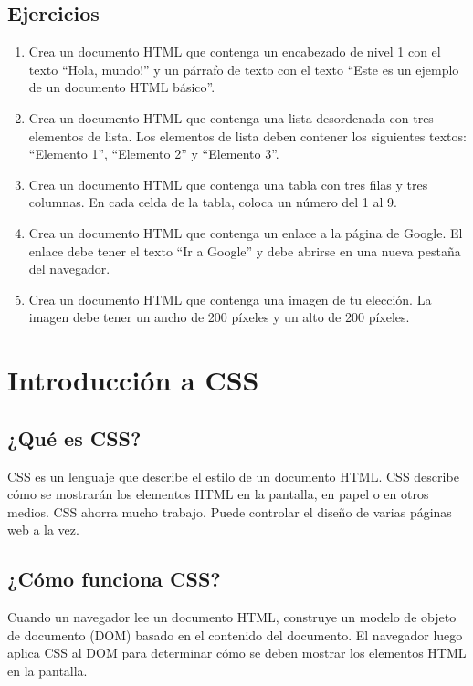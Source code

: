\documentclass[
  a4paper,
  DIV=11,
  numbers=noendperiod,
  onepage,
  openany]{scrreprt}
\begin{document}
\begin{tcolorbox}
\section{Ejercicios}\label{ejercicios}

\begin{enumerate}
\def\labelenumi{\arabic{enumi}.}
\item
  Crea un documento HTML que contenga un encabezado de nivel 1 con el
  texto ``Hola, mundo!'' y un párrafo de texto con el texto ``Este es un
  ejemplo de un documento HTML básico''.
\item
  Crea un documento HTML que contenga una lista desordenada con tres
  elementos de lista. Los elementos de lista deben contener los
  siguientes textos: ``Elemento 1'', ``Elemento 2'' y ``Elemento 3''.
\item
  Crea un documento HTML que contenga una tabla con tres filas y tres
  columnas. En cada celda de la tabla, coloca un número del 1 al 9.
\item
  Crea un documento HTML que contenga un enlace a la página de Google.
  El enlace debe tener el texto ``Ir a Google'' y debe abrirse en una
  nueva pestaña del navegador.
\item
  Crea un documento HTML que contenga una imagen de tu elección. La
  imagen debe tener un ancho de 200 píxeles y un alto de 200 píxeles.
\end{enumerate}

\chapter{Introducción a CSS}\label{introducciuxf3n-a-css}

\section{¿Qué es CSS?}\label{quuxe9-es-css}

CSS es un lenguaje que describe el estilo de un documento HTML. CSS
describe cómo se mostrarán los elementos HTML en la pantalla, en papel o
en otros medios. CSS ahorra mucho trabajo. Puede controlar el diseño de
varias páginas web a la vez.

\section{¿Cómo funciona CSS?}\label{cuxf3mo-funciona-css}

Cuando un navegador lee un documento HTML, construye un modelo de objeto
de documento (DOM) basado en el contenido del documento. El navegador
luego aplica CSS al DOM para determinar cómo se deben mostrar los
elementos HTML en la pantalla.


\end{tcolorbox}
\end{document}
